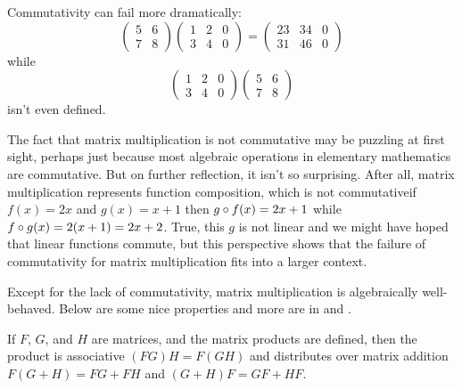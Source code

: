 \begin{example}  \label{ex:MatMultNoCommuteII}
Commutativity can fail more dramatically:
\begin{equation*}
    \begin{pmatrix}
      5  &6  \\
      7  &8
    \end{pmatrix}
    \begin{pmatrix}
      1  &2  &0 \\
      3  &4  &0
    \end{pmatrix}
  =
    \begin{pmatrix}
      23  &34  &0  \\
      31  &46  &0
    \end{pmatrix}
\end{equation*}
while
\begin{equation*}
    \begin{pmatrix}
      1  &2  &0 \\
      3  &4  &0
    \end{pmatrix}
    \begin{pmatrix}
      5  &6  \\
      7  &8
    \end{pmatrix}
\end{equation*}
isn't even defined.
\end{example}

\begin{remark}
The fact that
matrix multiplication is not commutative may be puzzling at first sight, 
perhaps just because most
algebraic operations in elementary mathematics are commutative.
But on further reflection, it isn't so surprising.
After all, matrix multiplication represents function composition, which
is not commutative\Dash if
\( f(x)=2x \) and \( g(x)=x+1 \) then \( g\mathbin\circ f(x)=2x+1 \)
while \( f\mathbin\circ g(x)=2(x+1)=2x+2 \).
True, this \( g \) is not linear and we might have hoped that linear functions
commute, but this perspective shows that the failure of commutativity for
matrix multiplication fits into a larger context.
\end{remark}

Except for the lack of commutativity,
matrix multiplication is algebraically well-behaved.
Below are some nice properties and more are in
 and
.

\begin{theorem}
\label{th:MatMultWellBehaved}
If \( F \), \( G \), and \( H \) are matrices,
and the matrix products are defined,
then the product is associative
$(FG)H=F(GH)$
and distributes over matrix addition
$F(G+H)=FG+FH$ and $(G+H)F=GF+HF$.
\end{theorem}

